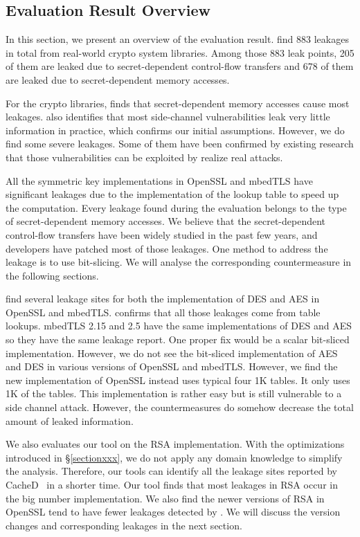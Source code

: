 \subsection{Evaluation Result Overview} \label{sec:eval_overview}
In this section, we present an overview of the evaluation result. 
\tool{} find 883 leakages in total from real-world crypto system libraries.
Among those 883 leak points, 205 of them are leaked due
to secret-dependent control-flow transfers and 678 of them are leaked 
due to secret-dependent memory accesses. 

For the crypto libraries, \tool{} finds that secret-dependent memory accesses 
cause most leakages. 
\tool{} also identifies that most side-channel vulnerabilities 
leak very little information in practice, which confirms our initial
assumptions. 
However, we do find some severe leakages. 
Some of them have been confirmed by existing research that those 
vulnerabilities can be exploited by realize real attacks. 

All the symmetric key implementations in OpenSSL and mbedTLS have
significant leakages due to the implementation of the lookup table
to speed up the computation. Every leakage found during the evaluation
belongs to the type of secret-dependent memory accesses. We believe that
the secret-dependent control-flow transfers have been widely studied in
the past few years, and developers have patched most of those leakages. 
One method to address the leakage is to use bit-slicing. We will analyse
the corresponding countermeasure in the following sections.

\tool{} find several leakage sites for both the implementation of DES and AES
in OpenSSL and mbedTLS\@. \tool{} confirms that all those leakages come from
table lookups. mbedTLS 2.15 and 2.5 have the same implementations
of DES and AES so they have the same leakage report. One proper fix would be 
a scalar bit-sliced implementation. However, we do not see the bit-sliced 
implementation of AES and DES in various versions of OpenSSL and mbedTLS\@.  
However, we find the new implementation of OpenSSL instead uses typical four 1K
tables. It only uses 1K of the tables. This implementation is rather easy but is
still vulnerable to a side channel attack. However, the countermeasures do
somehow decrease the total amount of leaked information.

We also evaluates our tool on the RSA implementation. With the optimizations
introduced in \S\ref{sectionxxx}, we do not apply any domain knowledge to 
simplify the analysis. Therefore, our tools can identify all the leakage 
sites reported by CacheD~\cite{203878} in a shorter time. Our tool
 finds that most leakages in RSA occur in the big number implementation.
We also find the newer versions of RSA in OpenSSL tend to have fewer leakages detected
by \tool{}. We will discuss the version changes and corresponding leakages 
in the next section.

